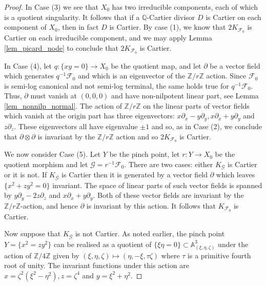 \documentclass[12pt, a4paper]{amsart}
\theoremstyle{definition}
\theoremstyle{named}
\begin{document}
\begin{proof}
\medskip

 In Case (3) we see that $X_0$ has two irreducible components, each 
 of which is a quotient singularity.  It follows that if a $\mathbb Q$-Cartier divisor $D$ is Cartier on each component of $X_0$, then in fact $D$ is Cartier.  By case (1), we know that 
 $2K_{\mathcal F_0}$ is Cartier on each irreducible component, and we may apply Lemma \ref{lem_picard_node} to conclude that $2K_{\mathcal F_0}$ is Cartier.
\medskip

 In Case (4), let $q\colon \{xy = 0\} \rightarrow X_0$
 be the quotient map, and let $\partial$ be a vector field which 
 generates $q^{-1}\mathcal F_0$ and which is an eigenvector of the $\mathbb Z/r\mathbb Z$ action.
 Since $\mathcal F_0$ is semi-log canonical and not semi-log terminal, the same holds true for $q^{-1}\mathcal F_0$.  Thus, $\partial$ must vanish at $(0, 0, 0)$ and have non-nilpotent linear part, see Lemma \ref{lem_nonnilp_normal}.
 The action of $\mathbb Z/r\mathbb Z$
 on the linear parts of vector fields which vanish at the origin
 part has three eigenvectors:
 $x\partial_x - y\partial_y, x\partial_x+y\partial_y$ and $z\partial_z$.  These eigenvectors 
 all have eigenvalue $\pm 1$
 and so, 
 as in Case (2), we conclude that  $\partial\otimes \partial$
 is invariant by the $\mathbb Z/r\mathbb Z$
 action and so $2K_{\mathcal F_0}$
 is Cartier.

\medskip

We now consider Case (5).  Let $Y$ be the pinch point, let $r\colon Y \rightarrow X_0$ be the quotient morphism and 
let $\mathcal G = r^{-1}\mathcal F_0$.
There are two cases: either $K_{\mathcal G}$ is Cartier or it is not.  If $K_{\mathcal G}$ is Cartier then it is generated by a vector field $\partial$ which leaves $\{x^2+zy^2 = 0\}$ invariant.
The space of linear parts of such vector fields is spanned by 
$y\partial_y-2z\partial_z$ and $x\partial_x+y\partial_y$.
Both of these vector fields are invariant by the 
$\mathbb Z/r\mathbb Z$-action, and hence 
$\partial$ is invariant by this action.
It follows that $K_{\mathcal F_0}$ is Cartier.

Now suppose that $K_{\mathcal G}$ is not Cartier.
As noted earlier, the pinch point  $Y = \{x^2=zy^2\}$ can be realised as a quotient of $\{\xi \eta = 0\} \subset \mathbb A_{(\xi, \eta, \zeta)}^3$ under the action of $\mathbb Z/4\mathbb Z$ given by
$(\xi, \eta, \zeta) \mapsto (\eta, -\xi, \tau \zeta)$ where $\tau$ is a primitive fourth root of unity.
The invariant functions under this action are
$x = \zeta^2(\xi^2-\eta^2), z = \zeta^4$ and $y = \xi^2+\eta^2$.


\end{proof}
\end{document}
